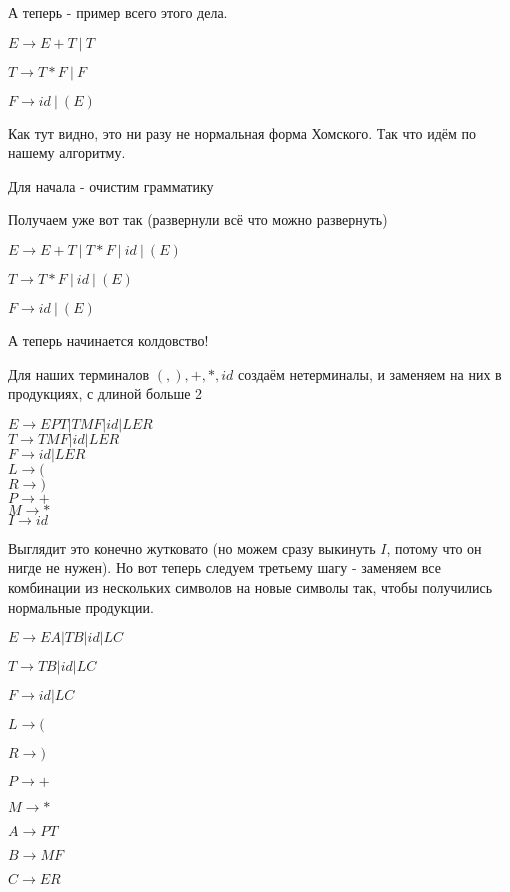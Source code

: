 \documentclass{article}
\begin{document}
А теперь - пример всего этого дела.
\begin{center}
$ E \to E+T \ | \ T $

$ T \to  T*F \ | \ F $

$ F \to id \ | \ (E) $
\end{center}


Как тут видно, это ни разу не нормальная форма Хомского. Так что идём по нашему алгоритму. 

Для начала - очистим грамматику

Получаем уже вот так (развернули всё что можно развернуть)
\begin{center}
$ E \to E+T \ | \ T*F \ | \ id \ | \ (E) $

$ T \to  T*F \ | \ id \ | \ (E) $

$ F \to id \ | \ (E) $
\end{center}

А теперь начинается колдовство!

Для наших терминалов $ (,),+,*,id $ создаём нетерминалы, и заменяем на них в продукциях, с длиной больше 2

\begin{center}
$ E \to EPT | TMF | id | LER $\\
$ T \to  TMF | id | LER $\\
$ F \to id | LER $\\
$ L \to ( $\\
$ R \to ) $\\
$ P \to + $\\
$ M \to * $\\
$ I \to id $\\
\end{center}

Выглядит это конечно жутковато (но можем сразу выкинуть $I$, потому что он нигде не нужен). 
Но вот теперь следуем третьему шагу - заменяем все комбинации из нескольких
символов на новые символы так, чтобы получились нормальные продукции.

\begin{center}
$ E \to EA | TB | id | LC $

$ T \to  TB | id | LC $

$ F \to id | LC $

$ L \to ( $

$ R \to ) $

$ P \to + $

$ M \to * $

$ A \to PT $

$ B \to MF $

$ C \to ER $
\end{center}
\end{document}
